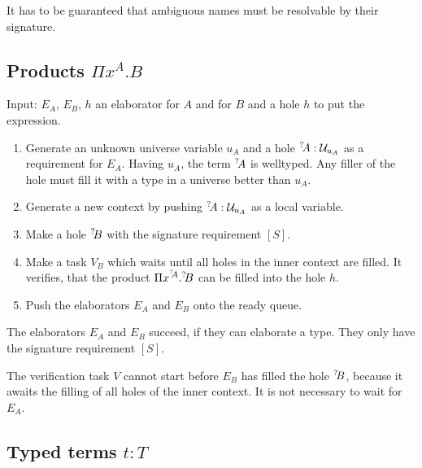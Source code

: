 It has to be guaranteed that ambiguous names must be resolvable by their
signature.








\subsection{Products $\Pi x^A. B$}

Input: $E_A$, $E_B$, $h$ an elaborator for $A$ and for $B$ and a hole $h$ to put
the expression.

\begin{enumerate}
    \item Generate an unknown universe variable $u_A$ and a hole ${{}^? \kern-0.2em A}:
        {\cal U}_{u_A}$ as a requirement for $E_A$. Having $u_A$, the term ${{}^? \kern-0.2em A}$
        is welltyped. Any filler of the hole must fill it with a type in a
        universe better than $u_A$.

    \item Generate a new context by pushing ${{}^? \kern-0.2em A}: {\cal U}_{u_A}$ as a local
        variable.

    \item Make a hole ${{}^? \kern-0.2em B}$ with the signature requirement $[S]$.

    \item Make a task $V_B$ which waits until all holes in the inner context are
        filled. It verifies, that the product $\Pi x^{{{}^? \kern-0.2em A}}. {{}^? \kern-0.2em B}$ can be
        filled into the hole $h$.

    \item Push the elaborators $E_A$ and $E_B$ onto the ready queue.
\end{enumerate}

The elaborators $E_A$ and $E_B$ succeed, if they can elaborate a type. They only
have the signature requirement $[S]$.

The verification task $V$ cannot start before $E_B$ has filled the hole ${{}^? \kern-0.2em B}$, because it awaits the filling of all holes of the inner context. It is not
necessary to wait for $E_A$.








\subsection{Typed terms $t: T$}

